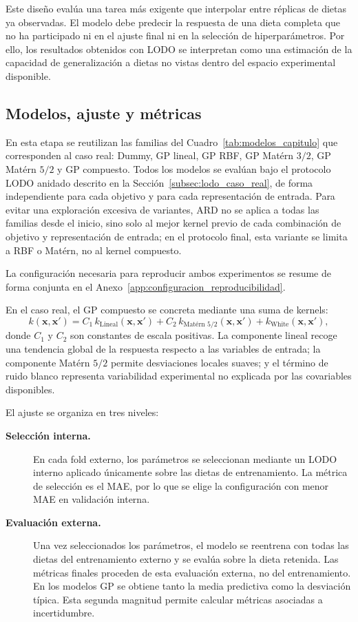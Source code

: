 Este diseño evalúa una tarea más exigente que interpolar entre réplicas de dietas ya observadas. El modelo debe predecir la respuesta de una dieta completa que no ha participado ni en el ajuste final ni en la selección de hiperparámetros. Por ello, los resultados obtenidos con LODO se interpretan como una estimación de la capacidad de generalización a dietas no vistas dentro del espacio experimental disponible.

\subsection{Modelos, ajuste y métricas}
\label{subsec:modelos_metricas_caso_real}

En esta etapa se reutilizan las familias del Cuadro~\ref{tab:modelos_capitulo} que corresponden al caso real: Dummy, GP lineal, GP RBF, GP Matérn \(3/2\), GP Matérn \(5/2\) y GP compuesto. Todos los modelos se evalúan bajo el protocolo LODO anidado descrito en la Sección~\ref{subsec:lodo_caso_real}, de forma independiente para cada objetivo y para cada representación de entrada. Para evitar una exploración excesiva de variantes, ARD no se aplica a todas las familias desde el inicio, sino solo al mejor kernel previo de cada combinación de objetivo y representación de entrada; en el protocolo final, esta variante se limita a RBF o Matérn, no al kernel compuesto.

La configuración necesaria para reproducir ambos experimentos se resume de forma conjunta en el Anexo~\ref{app:configuracion_reproducibilidad}.

En el caso real, el GP compuesto se concreta mediante una suma de kernels:
\[
k(\bm{x},\bm{x}')
=
C_1\,k_{\text{Lineal}}(\bm{x},\bm{x}')
+
C_2\,k_{\text{Matérn }5/2}(\bm{x},\bm{x}')
+
k_{\text{White}}(\bm{x},\bm{x}'),
\]
donde \(C_1\) y \(C_2\) son constantes de escala positivas. La componente lineal recoge una tendencia global de la respuesta respecto a las variables de entrada; la componente Matérn \(5/2\) permite desviaciones locales suaves; y el término de ruido blanco representa variabilidad experimental no explicada por las covariables disponibles.

El ajuste se organiza en tres niveles:

\begin{description}
    \item[\textbf{Selección interna.}]
    En cada fold externo, los parámetros se seleccionan mediante un LODO interno aplicado únicamente sobre las dietas de entrenamiento. La métrica de selección es el MAE, por lo que se elige la configuración con menor MAE en validación interna.

    \item[\textbf{Evaluación externa.}]
    Una vez seleccionados los parámetros, el modelo se reentrena con todas las dietas del entrenamiento externo y se evalúa sobre la dieta retenida. Las métricas finales proceden de esta evaluación externa, no del entrenamiento. En los modelos GP se obtiene tanto la media predictiva como la desviación típica. Esta segunda magnitud permite calcular métricas asociadas a incertidumbre. 
\end{description}


